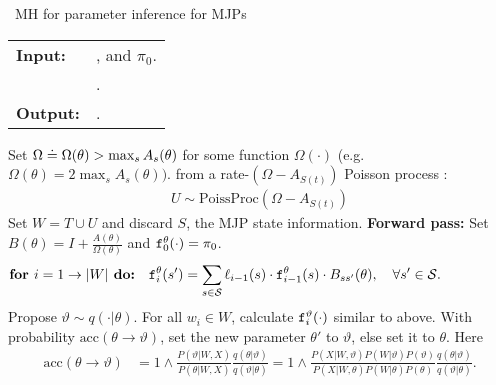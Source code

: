 \begin{algorithm}[H]
   \caption{\Naive\  MH for parameter inference for MJPs }
   \label{alg:MH_naive}
  \begin{tabular}{l l}
   \textbf{Input:  } & \text{Observations $X$}, 
                       \text{the MJP path $S(t) = (S, T)$, the  parameters $\theta$ }and $\pi_0$.\\ 
                     & \text{A  Metropolis-Hasting proposal $q(\cdot | \theta)$}.\\
   \textbf{Output:  }& \text{A new MJP trajectory $S'(t) = (S', T')$, 
                            new MJP parameters $\theta'$}.\\
   \hline
   \end{tabular}
   \begin{algorithmic}[1]
     \State Set $\Omega \doteq \Omega(\theta) > \max_s{A_s(\theta)}$ for
     some function $\Omega(\cdot)$ (e.g.\ $\Omega(\theta) = 
      2\max_s A_s(\theta))$.
       from a rate-$(\Omega-A_{S(t)})$ Poisson process : 
\begin{align*}
  U \sim \text{PoissProc}(\Omega - A_{S(t)}) 
\end{align*}
      \State 
    Set $W = T \cup U$ and discard $S$, the MJP state information.
    \State 
    \textbf{Forward pass:}
    Set $B(\theta) = I + \frac{A(\theta)}{\Omega(\theta)}$ and
    $\mathtt{f}^\theta_0(\cdot) = \pi_0$.
    $$\textbf{for } i=1\rightarrow |W|\textbf{ do:} \quad \mathtt{f}^{\theta}_i(s') = \sum_{s \in {\mathcal S}} \ell_{i-1}(s) \cdot \mathtt{f}^\theta_{i-1}(s)\cdot B_{ss'}(\theta), \quad \forall s' \in {\mathcal S}.\qquad\qquad\quad $$
      \State Propose $\vartheta \sim q(\cdot| \theta)$.
      For all $w_i \in W$, calculate $\mathtt{f}^\vartheta_i(\cdot)$ similar to above.
      \State With probability $\text{acc}(\theta\rightarrow\vartheta)$, set the new parameter $\theta'$ to $\vartheta$, else set it to $\theta$. Here 
          \begin{align}
            \label{eq:ncp_acc}
            \text{acc}(\theta \rightarrow \vartheta) &=  1 \wedge \frac{P(\vartheta|W, X)}{P(\theta|W, X)} \frac{q(\theta|\vartheta)}{q(\vartheta|\theta)}
          =  1 \wedge \frac{P(X| W,\vartheta) P(W | \vartheta)P(\vartheta)}
            {P(X|W, \theta)P(W | \theta)P(\theta)} \frac{q(\theta|\vartheta)}{q(\vartheta|\theta)}.

\end{align}
\end{algorithmic}
\end{algorithm}

